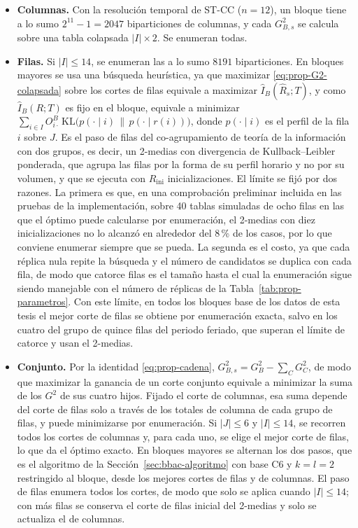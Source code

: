 \begin{itemize}
  \item \textbf{Columnas.} Con la resolución temporal de ST-CC ($n=12$), un
  bloque tiene a lo sumo $2^{11}-1 = 2047$ biparticiones de columnas, y cada
  $G^2_{B,s}$ se calcula sobre una tabla colapsada $|I|\times 2$. Se enumeran
  todas.
  \item \textbf{Filas.} Si $|I|\le 14$, se enumeran las a lo sumo $8191$
  biparticiones. En bloques mayores se usa una búsqueda heurística, ya que maximizar
  \eqref{eq:prop-G2-colapsada} sobre los cortes de filas equivale a maximizar
  $\hat I_B(\hat R_s;T)$, y como $\hat I_B(R;T)$ es fijo en el bloque, equivale
  a minimizar
  $\sum_{i\in I} O^B_{i\cdot}\,\mathrm{KL}\bigl(p(\cdot\mid i)\,\|\,p(\cdot\mid r(i))\bigr)$,
  donde $p(\cdot\mid i)$ es el perfil de la fila $i$ sobre $J$. Es el paso de
  filas del co-agrupamiento de teoría de la información \citep{Dhillon2003}
  con dos grupos, es decir, un 2-medias con divergencia de Kullback--Leibler
  ponderada, que agrupa las filas por la forma de su perfil horario y no por su
  volumen, y que se ejecuta con $R_{\mathrm{ini}}$ inicializaciones. El límite
  se fijó por dos razones. La primera es que, en una comprobación preliminar incluida
  en las pruebas de la implementación, sobre 40 tablas simuladas de ocho filas
  en las que el óptimo puede calcularse por enumeración, el 2-medias con diez
  inicializaciones no lo alcanzó en alrededor del 8\,\% de los casos, por lo que
  conviene enumerar siempre que se pueda. La segunda es el
  costo, ya que cada réplica nula repite la búsqueda y el número de candidatos se
  duplica con cada fila, de modo que catorce filas es el tamaño hasta el cual la
  enumeración sigue siendo manejable con el número de réplicas de la
  Tabla~\ref{tab:prop-parametros}. Con este límite, en todos los bloques base de los
  datos de esta tesis el mejor corte de filas se obtiene por enumeración exacta,
  salvo en los cuatro del
  grupo de quince filas del periodo feriado, que superan el límite de catorce y
  usan el 2-medias.
  \item \textbf{Conjunto.} Por la identidad \eqref{eq:prop-cadena},
  $G^2_{B,s} = G^2_B - \sum_{C} G^2_C$, de modo que maximizar la ganancia de
  un corte conjunto equivale a minimizar la suma de los $G^2$ de sus cuatro
  hijos. Fijado el corte de columnas, esa suma depende del corte de filas solo
  a través de los totales de columna de cada grupo de filas, y puede
  minimizarse por enumeración. Si $|J|\le 6$ y $|I|\le 14$, se recorren todos
  los cortes de columnas y, para cada uno, se elige el mejor corte de filas, lo
  que da el óptimo exacto. En bloques mayores se alternan los dos pasos, que es
  el algoritmo de la Sección~\ref{sec:bbac-algoritmo} con base C6 y $k=l=2$
  restringido al bloque, desde los mejores cortes de filas y de columnas. El paso
  de filas enumera todos los cortes, de modo que solo se aplica cuando $|I|\le 14$;
  con más filas se conserva el corte de filas inicial del 2-medias y solo se
  actualiza el de columnas.
\end{itemize}

